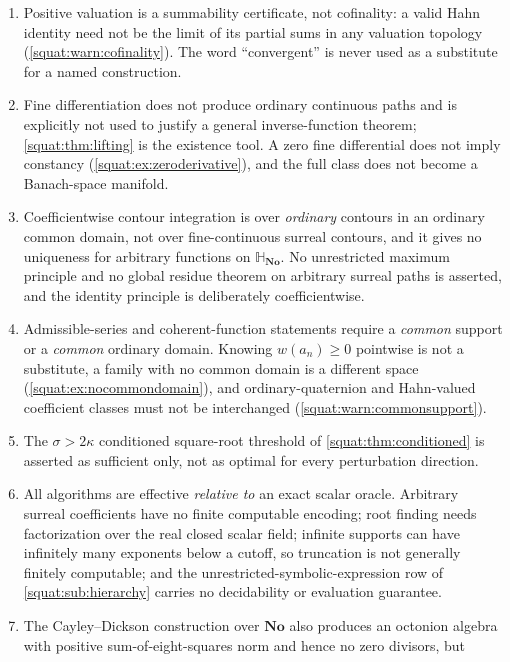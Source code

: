 \documentclass[11pt,letterpaper]{article}
\numberwithin{equation}{section}
\theoremstyle{definition}
\theoremstyle{remark}
\newcommand{\No}{\mathbf{No}}
\newcommand{\SQ}{\mathbb H_{\No}}
\begin{document}
\begin{enumerate}[label=\textup{(N\arabic*)},leftmargin=3.2em]
intrinsic topology with its subspace topology in $\No$.
\item\label{squat:nc:summability} Positive valuation is a summability certificate, not
cofinality: a valid Hahn identity need not be the limit of its partial sums in any
valuation topology (\cref{squat:warn:cofinality}). The word ``convergent'' is never used as
a substitute for a named construction.
\item\label{squat:nc:fine} Fine differentiation does not produce ordinary continuous paths
and is explicitly not used to justify a general inverse-function theorem;
\cref{squat:thm:lifting} is the existence tool. A zero fine differential does not imply
constancy (\cref{squat:ex:zeroderivative}), and the full class does not become a
Banach-space manifold.
\item\label{squat:nc:contours} Coefficientwise contour integration is over \emph{ordinary}
contours in an ordinary common domain, not over fine-continuous surreal contours, and it
gives no uniqueness for arbitrary functions on $\SQ$. No unrestricted maximum principle and
no global residue theorem on arbitrary surreal paths is asserted, and the identity
principle is deliberately coefficientwise.
\item\label{squat:nc:commonsupport} Admissible-series and coherent-function statements
require a \emph{common} support or a \emph{common} ordinary domain. Knowing
$w(a_n)\ge0$ pointwise is not a substitute, a family with no common domain is a different
space (\cref{squat:ex:nocommondomain}), and ordinary-quaternion and Hahn-valued coefficient
classes must not be interchanged (\cref{squat:warn:commonsupport}).
\item\label{squat:nc:threshold} The $\sigma>2\kappa$ conditioned square-root threshold of
\cref{squat:thm:conditioned} is asserted as sufficient only, not as optimal for every
perturbation direction.
\item\label{squat:nc:effective} All algorithms are effective \emph{relative to} an exact
scalar oracle. Arbitrary surreal coefficients have no finite computable encoding; root
finding needs factorization over the real closed scalar field; infinite supports can have
infinitely many exponents below a cutoff, so truncation is not generally finitely
computable; and the unrestricted-symbolic-expression row of
\cref{squat:sub:hierarchy} carries no decidability or evaluation guarantee.
\item\label{squat:nc:octonions} The Cayley--Dickson construction over $\No$ also produces
an octonion algebra with positive sum-of-eight-squares norm and hence no zero divisors, but

\end{enumerate}
\end{document}
